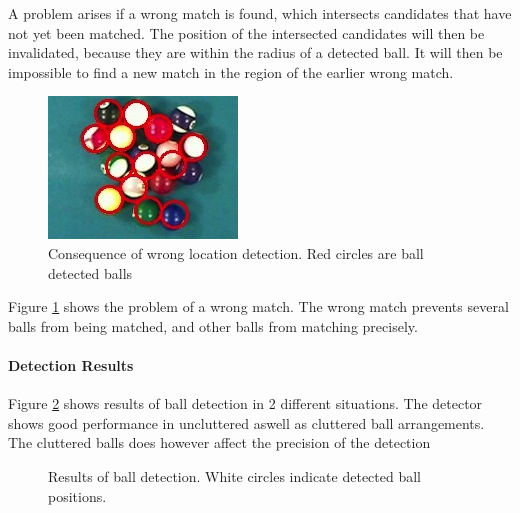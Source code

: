 A problem arises if a wrong match is found, which intersects candidates that have not yet been matched. The position of the intersected candidates will then be invalidated, because they are within the radius of a detected ball. It will then be impossible to find a new match in the region of the earlier wrong match. 
\begin{figure}[H]
\begin{center}
\includegraphics{images/wronglocate.jpg}
\caption{Consequence of wrong location detection. Red circles are ball detected balls}
\label{fig:wronglocate}
\end{center}
\end{figure}
Figure \ref{fig:wronglocate} shows the problem of a wrong match. The wrong match prevents several balls from being matched, and other balls from matching precisely.

\paragraph{Detection Results}
Figure \ref{fig:detect} shows results of ball detection in 2 different situations. The detector shows good performance in uncluttered aswell as cluttered ball arrangements. The cluttered balls does however affect the precision of the detection

\begin{figure}[H]
  \centering
  \quad           
   \caption{Results of ball detection. White circles indicate detected ball positions.}
  \label{fig:detect}
\end{figure}

